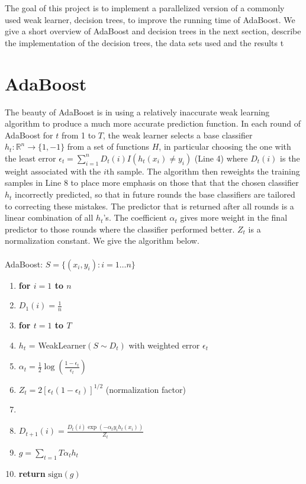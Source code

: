 \documentclass[12pt]{article}
\begin{document}
The goal of this project is to implement a parallelized version of a commonly
used weak learner, decision trees, to improve the running time of AdaBoost. We
give a short overview of AdaBoost and decision trees in the next section,
describe the implementation of the decision trees, the data sets used and the
results t 

\section{AdaBoost} The beauty of AdaBoost is in using a relatively inaccurate
weak learning algorithm to produce a much more accurate prediction function. In
each round of AdaBoost for $t$ from 1 to $T$, the weak learner selects a
base classifier $h_t: \mathbb{R}^n\rightarrow\{1,-1\}$ from a set of functions
$H$, in particular choosing the one with the least error
$\epsilon_t=\sum_{i=1}^{n}D_t(i)I(h_t(x_i)\neq y_i)$ (Line 4) where $D_t(i)$ is
the weight associated with the $i$th sample. The algorithm then reweights the
training samples in Line 8 to place more emphasis on those that that the chosen
classifier $h_t$ incorrectly predicted, so that in future rounds the base
classifiers are tailored to correcting these mistakes. The predictor that is
returned after all rounds is a linear combination of all $h_t$'s. The
coefficient $\alpha_t$ gives more weight in the final predictor to those rounds
where the classifier performed better. $Z_t$ is a normalization constant. We
give the algorithm below.\\ \\
{\sc AdaBoost}: $S = \{(x_i,y_i):i = 1\ldots n\}$
\begin{enumerate}
\itemsep1pt \parskip0pt 
\item {\bf for $i=1$ to $n$}
\item \quad $D_1(i) = \frac{1}{n}$
\item {\bf for $t=1$ to $T$}
\item \quad $h_t$ = {\sc WeakLearner}$(S\sim D_t)$ with weighted error $\epsilon_t$
\item \quad $\alpha_t = \frac{1}{2}\log(\frac{1-\epsilon_t}{\epsilon_t})$
\item \quad $Z_t = 2[\epsilon_t(1-\epsilon_t)]^{1/2}$ (normalization factor)
\item {}
\item \quad \quad $D_{t+1}(i) = \frac{D_t(i)\exp(-\alpha_t y_i h_t(x_i))}{Z_t}$
\item $g = \sum_{t=1}{T} \alpha_t h_t$
\item {\bf return} $\mbox{sign}(g)$
\end{enumerate}
\end{document}
